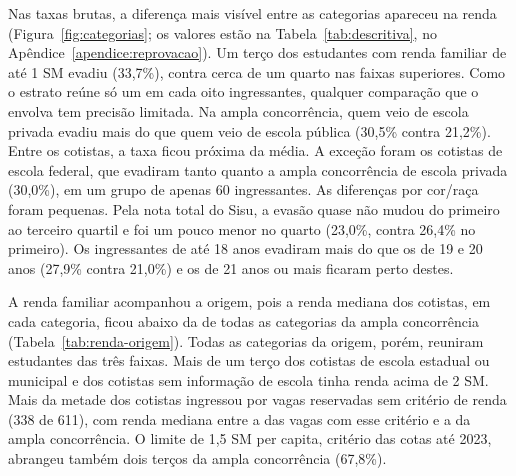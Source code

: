 \documentclass[12pt,a4paper]{article}
\newcommand{\tabela}[1]{\sbox\caixatabela{}%
  \ifdim\wd\caixatabela>\linewidth \resizebox{\linewidth}{!}{\usebox\caixatabela}%
  \else\ifdim\dimexpr\ht\caixatabela+\dp\caixatabela\relax>0.80\textheight
    \resizebox*{!}{0.80\textheight}{\usebox\caixatabela}%
  \else\usebox\caixatabela\fi\fi}
\begin{document}
Nas taxas brutas, a diferença mais visível entre as categorias apareceu na renda (Figura~\ref{fig:categorias}; os valores estão na Tabela~\ref{tab:descritiva}, no Apêndice~\ref{apendice:reprovacao}). Um terço dos estudantes com renda familiar de até 1 SM evadiu (33,7\%), contra cerca de um quarto nas faixas superiores. Como o estrato reúne só um em cada oito ingressantes, qualquer comparação que o envolva tem precisão limitada. Na ampla concorrência, quem veio de escola privada evadiu mais do que quem veio de escola pública (30,5\% contra 21,2\%). Entre os cotistas, a taxa ficou próxima da média. A exceção foram os cotistas de escola federal, que evadiram tanto quanto a ampla concorrência de escola privada (30,0\%), em um grupo de apenas 60 ingressantes. As diferenças por cor/raça foram pequenas. Pela nota total do Sisu, a evasão quase não mudou do primeiro ao terceiro quartil e foi um pouco menor no quarto (23,0\%, contra 26,4\% no primeiro). Os ingressantes de até 18 anos evadiram mais do que os de 19 e 20 anos (27,9\% contra 21,0\%) e os de 21 anos ou mais ficaram perto destes.

A renda familiar acompanhou a origem, pois a renda mediana dos cotistas, em cada categoria, ficou abaixo da de todas as categorias da ampla concorrência (Tabela~\ref{tab:renda-origem}). Todas as categorias da origem, porém, reuniram estudantes das três faixas. Mais de um terço dos cotistas de escola estadual ou municipal e dos cotistas sem informação de escola tinha renda acima de 2 SM. Mais da metade dos cotistas ingressou por vagas reservadas sem critério de renda (338 de 611), com renda mediana entre a das vagas com esse critério e a da ampla concorrência. O limite de 1,5 SM per capita, critério das cotas até 2023, abrangeu também dois terços da ampla concorrência (67,8\%).

\begin{table}[H]
  \centering
  \caption[Renda familiar segundo a origem e a modalidade de ingresso]{Renda familiar segundo a origem e a modalidade de ingresso, nas
  matrículas com renda informada ($n = 1{.}312$). A última coluna traz a renda
  familiar per capita de até 1,5 SM, critério de renda das cotas até 2023.
  AC indica ampla concorrência.}
  \label{tab:renda-origem}
  \setlength{\tabcolsep}{3pt}
  \tabela{tab_art_renda_origem.tex}
\end{table}
\end{document}
